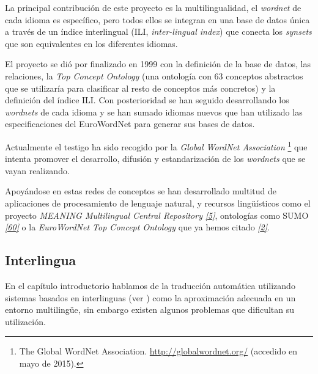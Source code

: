 \documentclass[a4paper,12pt,spanish]{book}
\begin{document}
La principal contribución de este proyecto es la multilingualidad, el \emph{wordnet} de cada idioma
es específico, pero todos ellos se integran en una base de datos única a través de un índice
interlingual (ILI, \emph{inter-lingual index}) que conecta los \emph{synsets} que son equivalentes
en los diferentes idiomas.

El proyecto se dió por finalizado en 1999 con la definición de la base de datos, las relaciones,
la \emph{Top Concept Ontology} (una ontología con 63 conceptos abstractos que se utilizaría para
clasificar al resto de conceptos más concretos) y la definición del índice ILI. Con
posterioridad se han seguido desarrollando los \emph{wordnets} de cada idioma y se han sumado
idiomas nuevos que han utilizado las especificaciones del EuroWordNet para generar sus bases
de datos.

Actualmente el testigo ha sido recogido por la \emph{Global WordNet Association} \footnote{
The Global WordNet Association. \href{http://globalwordnet.org/}{http://globalwordnet.org/} (accedido en mayo de 2015).
} que intenta
promover el desarrollo, difusión y estandarización de los \emph{wordnets} que se vayan realizando.

Apoyándose en estas redes de conceptos se han desarrollado multitud de aplicaciones
de procesamiento de lenguaje natural, y recursos lingüísticos como el proyecto \emph{MEANING
Multilingual Central Repository} \label{1.state-of-the-art/i.representacion-conocimiento:id35}{\hyperref[zreferences:atserias2004]{\emph{{[}5{]}}}}, ontologías como SUMO \label{1.state-of-the-art/i.representacion-conocimiento:id36}{\hyperref[zreferences:niles2001]{\emph{{[}60{]}}}}
o la \emph{EuroWordNet Top Concept Ontology} que ya hemos citado \label{1.state-of-the-art/i.representacion-conocimiento:id37}{\hyperref[zreferences:alvez2008]{\emph{{[}2{]}}}}.


\subsection{Interlingua}
\label{1.state-of-the-art/i.representacion-conocimiento:interlingua}
En el capítulo introductorio hablamos de la traducción automática utilizando sistemas basados
en interlinguas (ver ) como la aproximación
adecuada en un entorno multilingüe, sin embargo existen algunos problemas que dificultan
su utilización.
\end{document}
